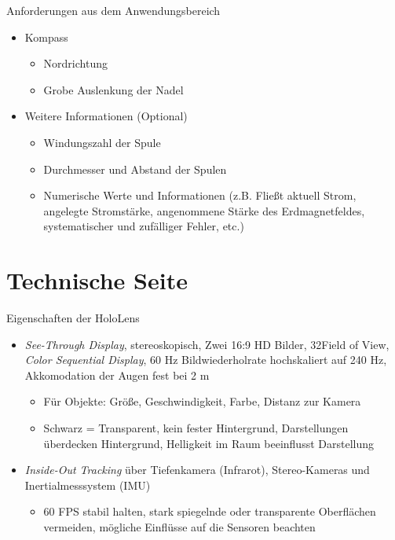 \begin{frame}[fragile]{Anforderungen aus dem Anwendungsbereich}
\begin{itemize}
\setlength{\itemsep}{-0.25em}
\item Kompass
\begin{itemize}
\setlength{\itemsep}{-0.25em}
\item Nordrichtung
\item Grobe Auslenkung der Nadel
\end{itemize}
\item Weitere Informationen (Optional)
\begin{itemize}
\item Windungszahl der Spule
\item Durchmesser und Abstand der Spulen
\item Numerische Werte und Informationen (z.B. Fließt aktuell Strom, angelegte Stromstärke, angenommene Stärke des Erdmagnetfeldes, systematischer und zufälliger Fehler, etc.)
\end{itemize}
\end{itemize}
\end{frame}

\part{Technische Seite}
\label{part:tech}

\begin{frame}[fragile]{Eigenschaften der HoloLens}
\begin{itemize}
\item \textit{See-Through Display}, stereoskopisch, Zwei 16:9 HD Bilder, 32\degree Field of View, \textit{Color Sequential Display}, 60 Hz Bildwiederholrate hochskaliert auf 240 Hz, Akkomodation der Augen fest bei 2 m
\pause
\begin{itemize}
\item Für Objekte: Größe, Geschwindigkeit, Farbe, Distanz zur Kamera
\pause
\item Schwarz = Transparent, kein fester Hintergrund, Darstellungen überdecken Hintergrund, Helligkeit im Raum beeinflusst Darstellung
\end{itemize}
\pause
\item \textit{Inside-Out Tracking} über Tiefenkamera (Infrarot), Stereo-Kameras und Inertialmesssystem (IMU)
\begin{itemize}
\pause
\item 60 FPS stabil halten, stark spiegelnde oder transparente Oberflächen vermeiden, mögliche Einflüsse auf die Sensoren beachten
\end{itemize}
\end{itemize}
\end{frame}

